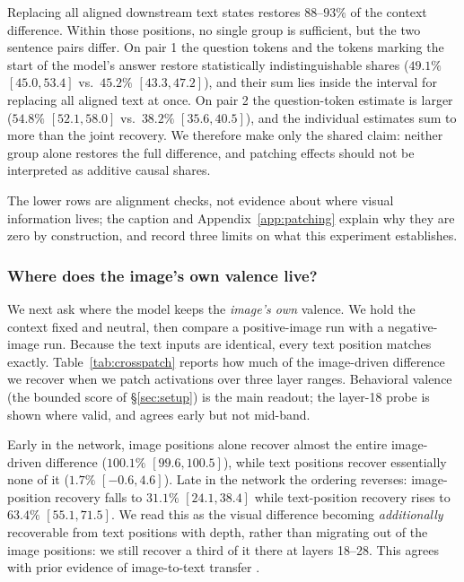 \documentclass{article}
\begin{document}
Replacing all aligned downstream text states restores $88$--$93\%$ of the context difference. Within those positions, no single group is sufficient, but the two sentence pairs differ. On pair 1 the question tokens and the tokens marking the start of the model's answer restore statistically indistinguishable shares ($49.1\%$ $[45.0, 53.4]$ vs.\ $45.2\%$ $[43.3, 47.2]$), and their sum lies inside the interval for replacing all aligned text at once. On pair 2 the question-token estimate is larger ($54.8\%$ $[52.1, 58.0]$ vs.\ $38.2\%$ $[35.6, 40.5]$), and the individual estimates sum to more than the joint recovery. We therefore make only the shared claim: neither group alone restores the full difference, and patching effects should not be interpreted as additive causal shares.

The lower rows are alignment checks, not evidence about where visual information lives; the caption and Appendix~\ref{app:patching} explain why they are zero by construction, and record three limits on what this experiment establishes.

\subsubsection{Where does the image's own valence live?}
\label{sec:crosspatch}

We next ask where the model keeps the \emph{image's own} valence. We hold the context fixed and neutral, then compare a positive-image run with a negative-image run. Because the text inputs are identical, every text position matches exactly. Table~\ref{tab:crosspatch} reports how much of the image-driven difference we recover when we patch activations over three layer ranges. Behavioral valence (the bounded score of \S\ref{sec:setup}) is the main readout; the layer-18 probe is shown where valid, and agrees early but not mid-band.

Early in the network, image positions alone recover almost the entire image-driven difference ($100.1\%$ $[99.6, 100.5]$), while text positions recover essentially none of it ($1.7\%$ $[-0.6, 4.6]$). Late in the network the ordering reverses: image-position recovery falls to $31.1\%$ $[24.1, 38.4]$ while text-position recovery rises to $63.4\%$ $[55.1, 71.5]$. We read this as the visual difference becoming \emph{additionally} recoverable from text positions with depth, rather than migrating out of the image positions: we still recover a third of it there at layers 18--28. This agrees with prior evidence of image-to-text transfer \citep{basu2024, whatsintheimage2025}.
\end{document}
